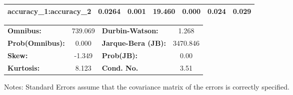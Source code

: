 \begin{center}
\begin{tabular}{lcccccc}
\textbf{accuracy\_1:accuracy\_2} &       0.0264  &        0.001     &    19.460  &         0.000        &        0.024    &        0.029     \\
\bottomrule
\end{tabular}
\begin{tabular}{lclc}
\textbf{Omnibus:}       & 739.069 & \textbf{  Durbin-Watson:     } &    1.268  \\
\textbf{Prob(Omnibus):} &   0.000 & \textbf{  Jarque-Bera (JB):  } & 3470.846  \\
\textbf{Skew:}          &  -1.349 & \textbf{  Prob(JB):          } &     0.00  \\
\textbf{Kurtosis:}      &   8.123 & \textbf{  Cond. No.          } &     3.51  \\
\bottomrule
\end{tabular}
\end{center}

Notes: \newline
 [1] Standard Errors assume that the covariance matrix of the errors is correctly specified.
